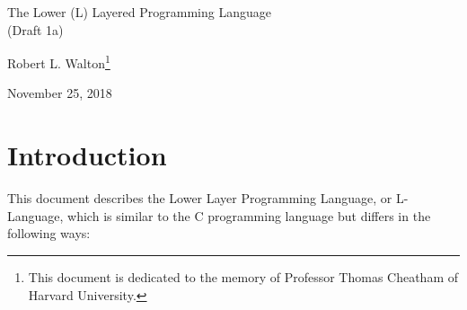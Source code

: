 \documentclass[12pt]{article}
\makeatletter
\renewcommand\tableofcontents{%
    \begin{list}{}%
	     {\setlength{\itemsep}{0in}%
	      \setlength{\topsep}{0in}%
	      \setlength{\parsep}{1ex}%
	      \setlength{\labelwidth}{0in}%
	      \setlength{\baselineskip}{1.5ex}%
	      \setlength{\leftmargin}{1.0in}%
	      \setlength{\rightmargin}{1.0in}}%
    \item\@starttoc{toc}%
    \end{list}}
\makeatother
\begin{document}
        
\begin{center}

{\Large
The Lower (L) Layered Programming Language \\[0.5ex]
(Draft 1a)}

\medskip

Robert L. Walton\footnote{This document is dedicated to the memory
of Professor Thomas Cheatham of Harvard University.}

November 25, 2018
 
\end{center}

{\small \tableofcontents}

\newpage

\section{Introduction}

This document describes the Lower Layer Programming Language, or
L-Language, which is similar to the C programming language
but differs in the following ways:
\end{document}
